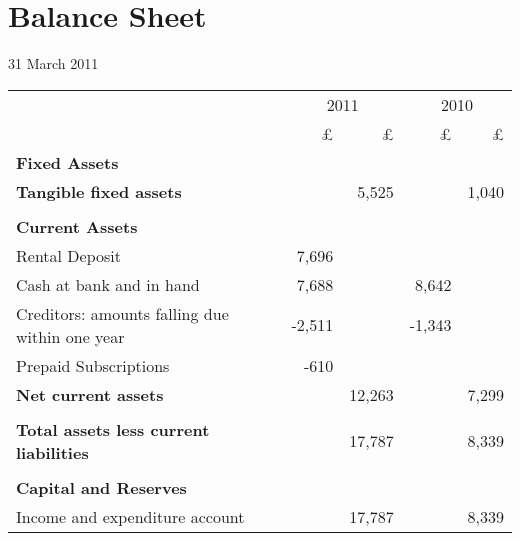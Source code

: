 \section{Balance Sheet}
31 March 2011

\begin{center}
\begin{tabular}{  l  r  r r r}
\toprule
                            & \multicolumn{2}{c}{2011} &  \multicolumn{2}{c}{2010} \\
\cmidrule(r){2-3} \cmidrule(r){4-5}
                                                & £      & £     & £     & £     \\
{\bf Fixed Assets}                              &        &       &       &       \\
{\bf Tangible fixed assets}                     &        & 5,525 &       & 1,040 \\
\cmidrule(r){2-3} \cmidrule(r){4-5} \\
{\bf Current Assets}                            &        &       &       &       \\
Rental Deposit                                  & 7,696  &       &       &       \\
Cash at bank and in hand                        & 7,688  &       & 8,642 &       \\
Creditors: amounts falling due within one year  & -2,511 &       & -1,343&      \\
Prepaid Subscriptions                           & -610   &       &       &      \\
{\bf Net current assets}                        &        & 12,263 &       & 7,299 \\
\cmidrule(r){2-3} \cmidrule(r){4-5} \\
{\bf Total assets less current liabilities}     &        & 17,787 &       & 8,339 \\
\cmidrule(r){2-3} \cmidrule(r){4-5}  \\
{\bf Capital and Reserves}&\\
Income and expenditure account                  &        & 17,787 &       & 8,339 \\
\bottomrule
\end{tabular}

\end{center}

